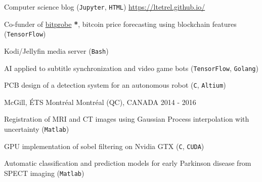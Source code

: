 


\begin{cventries}


\cventry
{} %
{} %
{} %
{} %
{ %
\vspace{-5mm}
\begin{cvitems}
\item {Computer science blog (\texttt{Jupyter}, \texttt{HTML}) \url{https://ltetrel.github.io/}}
\item {Co-funder of \href{https://bitprobe.io/}{bitprobe} \textbf{*}, bitcoin price forecasting using blockchain features (\texttt{TensorFlow})}
\item {Kodi/Jellyfin media server (\texttt{Bash})}
\item {AI applied to subtitle synchronization and video game bots (\texttt{TensorFlow}, \texttt{Golang})}
\item{PCB design of a detection system for an autonomous robot (\texttt{C}, \texttt{Altium})}
\end{cvitems}
}


\cventry
{} %
{McGill, ÉTS Montréal} %
{\hspace{-5mm}Montréal (QC), CANADA} %
{2014 - 2016} %
{ %
\vspace{-5mm}
\begin{cvitems}
\item {Registration of MRI and CT images using Gaussian Process interpolation with uncertainty (\texttt{Matlab})}
\item {GPU implementation of sobel filtering on Nvidia GTX (\texttt{C}, \texttt{CUDA})}
\item {Automatic classification and prediction models for early Parkinson disease from SPECT imaging (\texttt{Matlab})}
\end{cvitems}
}


\end{cventries}
